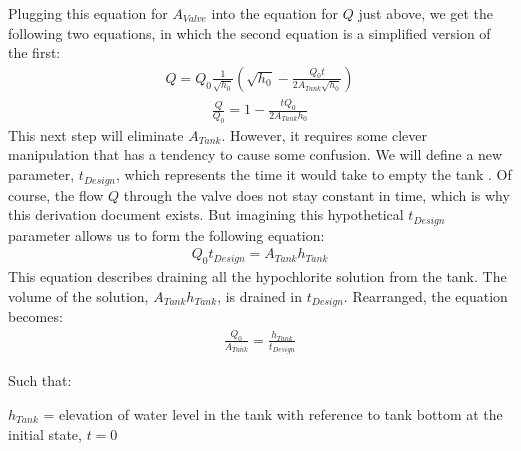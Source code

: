 \documentclass[letterpaper,10pt,english]{sphinxmanual}
\begin{document}
Plugging this equation for \(A_{Valve}\) into the equation for \(Q\) just above, we get the following two equations, in which the second equation is a simplified version of the first:
\begin{equation}\label{equation:Flow_Control_and_Measurement/FCM_Derivations:Flow_Control_and_Measurement/FCM_Derivations:9}
\begin{split}Q = Q_0 \frac{1}{\sqrt{h_0}} \left( \sqrt{h_0} - \frac{Q_0 t}{2 A_{Tank} \sqrt{h_0}} \right)\end{split}
\end{equation}\begin{equation}\label{equation:Flow_Control_and_Measurement/FCM_Derivations:Flow_Control_and_Measurement/FCM_Derivations:10}
\begin{split}\frac{Q}{Q_0} = 1 - \frac{t Q_0}{2 A_{Tank} h_0}\end{split}
\end{equation}
This next step will eliminate \(A_{Tank}\). However, it requires some clever manipulation that has a tendency to cause some confusion. We will define a new parameter, \(t_{Design}\), which represents the time it would take to empty the tank . Of course, the flow \(Q\) through the valve does not stay constant in time, which is why this derivation document exists. But imagining this hypothetical \(t_{Design}\) parameter allows us to form the following equation:
\begin{equation}\label{equation:Flow_Control_and_Measurement/FCM_Derivations:Flow_Control_and_Measurement/FCM_Derivations:11}
\begin{split}Q_0 t_{Design} = A_{Tank} h_{Tank}\end{split}
\end{equation}
This equation describes draining all the hypochlorite solution from the tank. The volume of the solution, \(A_{Tank} h_{Tank}\), is drained in \(t_{Design}\). Rearranged, the equation becomes:
\begin{equation}\label{equation:Flow_Control_and_Measurement/FCM_Derivations:Flow_Control_and_Measurement/FCM_Derivations:12}
\begin{split}\frac{Q_0}{A_{Tank}} = \frac{h_{Tank}}{t_{Design}}\end{split}
\end{equation}
\begin{DUlineblock}{0em}
\item[] Such that:
\item[] \(h_{Tank}\) = elevation of water level in the tank with reference to tank bottom at the initial state, \(t = 0\)
\end{DUlineblock}
\end{document}
